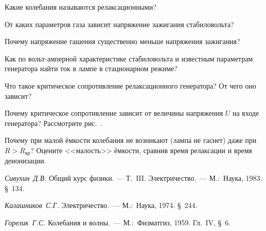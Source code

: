 \begin{lab:questions}
	\item Какие колебания называются релаксационными?

	\item От каких параметров газа зависит напряжение зажигания стабиловольта?

	\item Почему напряжение гашения существенно меньше напряжения зажигания?


	\item Как по вольт-амперной характеристике стабиловольта и известным параметрам генератора найти ток в лампе в стационарном
режиме?

	\item Что такое критическое сопротивление релаксационного генератора? От чего оно зависит?

	\item Почему критическое сопротивление зависит от величины напряжения $U$ на входе генератора? Рассмотрите рис.~.

	\item Почему при малой ёмкости колебания не возникают (лампа не гаснет) даже при $R>R_{\text{кр}}$? Оцените <<малость>> ёмкости,
сравнив время релаксации и время деионизации.
\end{lab:questions}

\begin{lab:literature}

	\item \emph{Сивухин~Д.В.} Общий курс физики. --- Т.~III. Электричество.~--- М.:~Наука, 1983. \S~134.

	\item \emph{Калашников~С.Г.} Электричество.~--- М.:~Наука, 1974. \S~244.

	\item \emph{Горелик~Г.С.} Колебания и волны.~--- М.:~Физматгиз, 1959. Гл.~IV, \S~6.

\end{lab:literature}